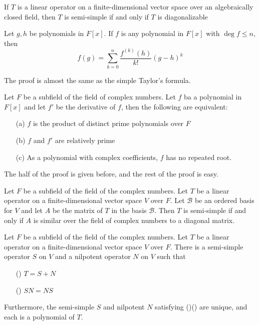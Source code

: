 \documentclass{article}
\begin{document}
\begin{coro}
	If $T$ is a linear operator on a finite-dimensional vector space over an algebraically closed field, then $T$ is semi-simple if and only if $T$ is diagonalizable
\end{coro}
\begin{lem}
	Let $g,h$ be polynomials in $F[x]$. If $f$ is any polynomial in $F[x]$ with $\deg f\le n$, then
	\[f(g)=\sum_{k=0}^n\frac{f^{(k)}(h)}{k!}(g-h)^k\]
\end{lem}
The proof is almost the same as the simple Taylor's formula.
\begin{lem}
	Let $F$ be a subfield of the field of complex numbers. Let $f$ ba a polynomial in $F[x]$ and let $f'$ be the derivative of $f$, then the following are equivalent:
	\begin{enumerate}
		\item [(a)]$f$ is the product of distinct prime polynomials over $F$
		\item [(b)]$f$ and $f'$ are relatively prime
		\item [(c)]As a polynomial with complex coefficients, $f$ has no repeated root.
	\end{enumerate}
\end{lem}
The half of the proof is given before, and the rest of the proof is easy.
\begin{thm}
	Let $F$ be a subfield of the field of the complex numbers. Let $T$ be a linear operator on a finite-dimensional vector space $V$ over $F$. Let $\mathcal{B}$ be an ordered  basis for $V$ and let $A$ be the matrix of $T$ in the basis $\mathcal{B}$. Then $T$ is semi-simple if and only if $A$ is similar over the field of complex numbers to a diagonal matrix. 
\end{thm}
\begin{thm}
	Let $F$ be a subfield of the field of the complex numbers. Let $T$ be a linear operator on a finite-dimensional vector space $V$ over $F$. There is a semi-simple operator $S$ on $V$ and a nilpotent operator $N$ on $V$ such that
	\begin{enumerate}
		\item [(\romannumeral1)]$T=S+N$
		\item [(\romannumeral2)]$SN=NS$
	\end{enumerate} 
	Furthermore, the semi-simple $S$ and nilpotent $N$ satisfying ()() are unique, and each is a polynomial of $T$.
\end{thm}
\end{document}
